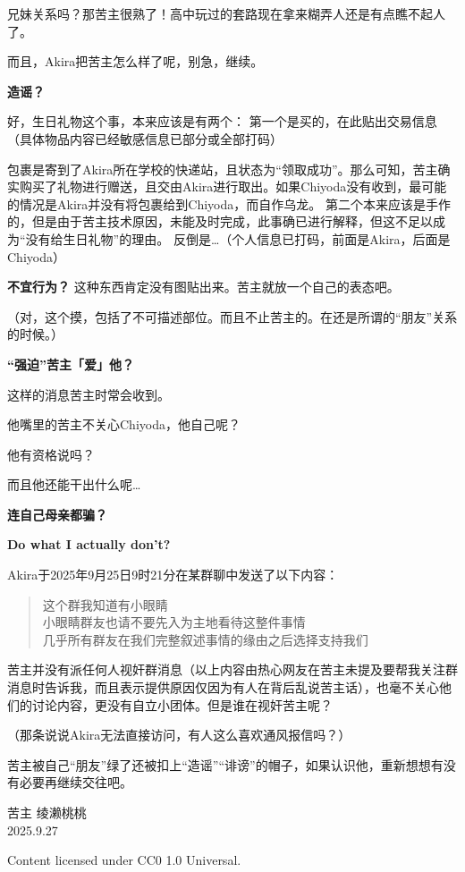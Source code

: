 \documentclass[12pt]{ctexart}
\begin{document}

兄妹关系吗？那苦主很熟了！高中玩过的套路现在拿来糊弄人还是有点瞧不起人了。

而且，Akira把苦主怎么样了呢，别急，继续。

\textbf{造谣？}


好，生日礼物这个事，本来应该是有两个：
第一个是买的，在此贴出交易信息（具体物品内容已经敏感信息已部分或全部打码）


包裹是寄到了Akira所在学校的快递站，且状态为“领取成功”。那么可知，苦主确实购买了礼物进行赠送，且交由Akira进行取出。如果Chiyoda没有收到，最可能的情况是Akira并没有将包裹给到Chiyoda，而自作乌龙。
第二个本来应该是手作的，但是由于苦主技术原因，未能及时完成，此事确已进行解释，但这不足以成为“没有给生日礼物”的理由。
反倒是…（个人信息已打码，前面是Akira，后面是Chiyoda）


\textbf{不宜行为？}
这种东西肯定没有图贴出来。苦主就放一个自己的表态吧。


（对，这个摸，包括了不可描述部位。而且不止苦主的。在还是所谓的“朋友”关系的时候。）

\textbf{“强迫”苦主「爱」他？}


这样的消息苦主时常会收到。

他嘴里的苦主不关心Chiyoda，他自己呢？


他有资格说吗？

而且他还能干出什么呢…

\textbf{连自己母亲都骗？}


\textbf{Do what I actually don't?}

Akira于2025年9月25日9时21分在某群聊中发送了以下内容：

\begin{quote}
这个群我知道有小眼睛\\
小眼睛群友也请不要先入为主地看待这整件事情\\
几乎所有群友在我们完整叙述事情的缘由之后选择支持我们
\end{quote}

苦主并没有派任何人视奸群消息（以上内容由热心网友在苦主未提及要帮我关注群消息时告诉我，而且表示提供原因仅因为有人在背后乱说苦主话），也毫不关心他们的讨论内容，更没有自立小团体。但是谁在视奸苦主呢？


（那条说说Akira无法直接访问，有人这么喜欢通风报信吗？）

苦主被自己“朋友”绿了还被扣上“造谣”“诽谤”的帽子，如果认识他，重新想想有没有必要再继续交往吧。

苦主 绫濑桃桃\\
2025.9.27

\vspace{2em}
Content licensed under CC0 1.0 Universal.
\end{document}
